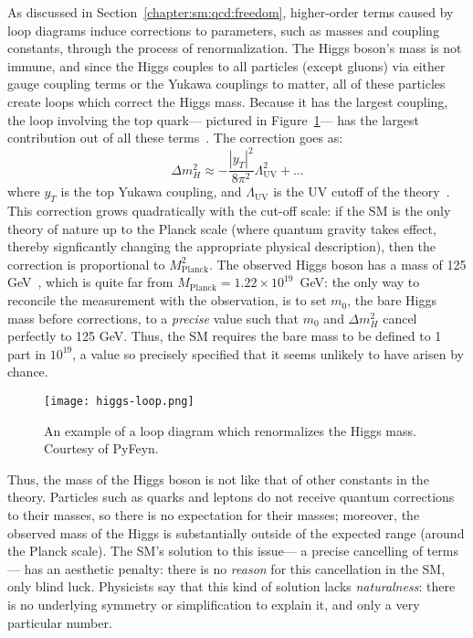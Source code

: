 As discussed in Section~\ref{chapter:sm:qcd:freedom}, higher-order terms caused by loop diagrams induce corrections to parameters, such as masses and coupling constants, through the process of renormalization. The Higgs boson's mass is not immune, and since the Higgs couples to all particles (except gluons) via either gauge coupling terms or the Yukawa couplings to matter, all of these particles create loops which correct the Higgs mass. Because it has the largest coupling, the loop involving the top quark--- pictured in Figure~\ref{fig:susy:higgs-loop}---  has the largest contribution out of all these terms~\cite{Martin1997}. The correction goes as:
%
\begin{equation}
\Delta m_H^2 \approx - \frac{|y_T|^2}{8\pi^2}\Lambda_\mathrm{UV}^2 + \ldots
\end{equation}
%
where $y_T$ is the top Yukawa coupling, and $\Lambda_\mathrm{UV}$ is the UV cutoff of the theory~\cite{Martin1997}. This correction grows quadratically with the cut-off scale: if the SM is the only theory of nature up to the Planck scale (where quantum gravity takes effect, thereby signficantly changing the appropriate physical description), then the correction is proportional to $M_\mathrm{Planck}^2$. The observed Higgs boson has a mass of 125 GeV~\cite{CombinedHiggs}, which is quite far from $M_\mathrm{Planck} = 1.22\times 10^{19}$~GeV: the only way to reconcile the measurement with the observation, is to set $m_0$, the bare Higgs mass before corrections, to a \textit{precise} value such that $m_0$ and $\Delta m_H^2$ cancel perfectly to 125 GeV. Thus, the SM requires the bare mass to be  defined to 1 part in $10^{19}$, a value so precisely specified that it seems unlikely to have arisen by chance. 


\begin{figure}
\centering
\texttt{[image: higgs-loop.png]}
\label{fig:susy:higgs-loop}
\caption{An example of a loop diagram which renormalizes the Higgs mass. Courtesy of PyFeyn.}
\end{figure}


Thus, the mass of the Higgs boson is not like that of other constants in the theory. Particles such as quarks and leptons do not receive quantum corrections to their masses, so there is no expectation for their masses; moreover, the observed mass of the Higgs is substantially outside of the expected range (around the Planck scale).  The SM's solution to this issue--- a precise cancelling of terms--- has an aesthetic penalty: there is no \textit{reason} for this cancellation in the SM, only blind luck. Physicists say that this kind of solution lacks \textit{naturalness}: there is no underlying symmetry or simplification to explain it, and only a very particular number.



